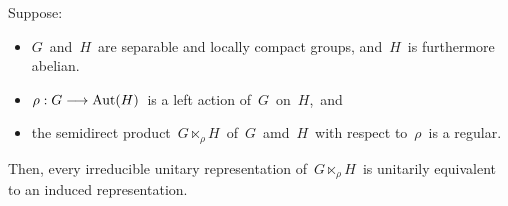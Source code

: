 \vskip 0.5cm
\begin{theorem}
\mbox{}
\vskip 0.1cm
\noindent
Suppose:
\begin{itemize}
\item
	$G$\, and \,$H$\, are separable and locally compact groups, and
	\,$H$\, is furthermore abelian.
\item
	$\rho : G \longrightarrow \textnormal{Aut}(H)$\,
	is a left action of \,$G$\, on \,$H$,\, and
\item
	the semidirect product
	\,$G \ltimes_{\rho}\! H$\, of \,$G$\, amd \,$H$\,
	with respect to \,$\rho$\,
	is a regular.
\end{itemize}
Then, every irreducible unitary representation of
\,$G \ltimes_{\rho}\! H$\,
is unitarily equivalent to an induced representation.
\end{theorem}

